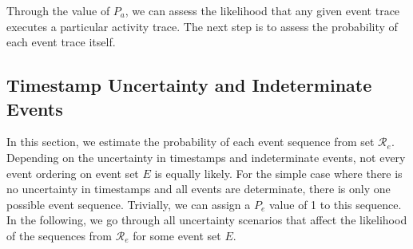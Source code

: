 Through the value of $P_a$, we can assess the likelihood that any given event trace executes a particular activity trace.
The next step is to assess the probability of each event trace itself.


\subsection{Timestamp Uncertainty and Indeterminate Events}

In this section, we estimate the probability of each event sequence from set $\mathcal{R}_e$.
Depending on the uncertainty in timestamps and indeterminate events, not every event ordering on event set $E$ is equally likely.
For the simple case where there is no uncertainty in timestamps and all events are determinate, there is only one possible event sequence.
Trivially, we can assign a $P_e$ value of 1 to this sequence.
In the following, we go through all uncertainty scenarios that affect the likelihood of the sequences from $\mathcal{R}_e$ for some event set $E$.

